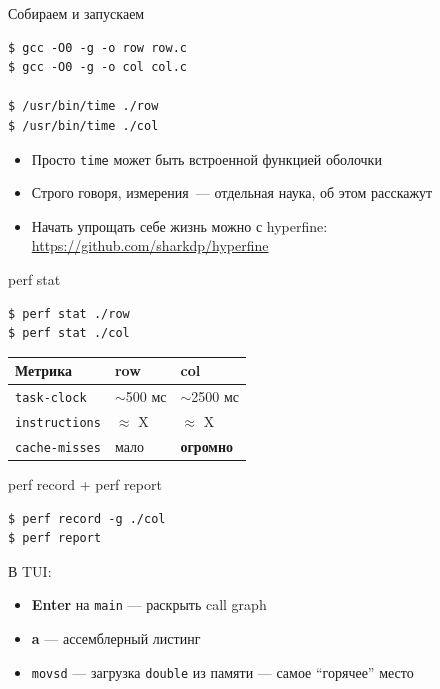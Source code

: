 \documentclass{../../slides-style}
\begin{document}
\begin{frame}[fragile]{Собираем и запускаем}
    \begin{verbatim}
$ gcc -O0 -g -o row row.c
$ gcc -O0 -g -o col col.c

$ /usr/bin/time ./row
$ /usr/bin/time ./col
\end{verbatim}

    \begin{itemize}
        \item Просто \texttt{time} может быть встроенной функцией оболочки
        \item Строго говоря, измерения~--- отдельная наука, об этом расскажут
        \item Начать упрощать себе жизнь можно с hyperfine: \url{https://github.com/sharkdp/hyperfine}
    \end{itemize}

\end{frame}

\begin{frame}[fragile]{perf stat}
    \begin{verbatim}
$ perf stat ./row
$ perf stat ./col
\end{verbatim}

    \bigskip
    \begin{center}
        \begin{tabular}{lll}
            \toprule
            Метрика               & row          & col                      \\
            \midrule
            \texttt{task-clock}   & $\sim$500 мс & $\sim$2500 мс            \\
            \texttt{instructions} & $\approx$ X  & $\approx$ X              \\
            \texttt{cache-misses} & мало         & \alert{\textbf{огромно}} \\
            \bottomrule
        \end{tabular}
    \end{center}

\end{frame}

\begin{frame}[fragile]{perf record + perf report}
    \begin{verbatim}
$ perf record -g ./col
$ perf report
\end{verbatim}

    \bigskip
    В TUI:
    \begin{itemize}
        \item \textbf{Enter} на \texttt{main} --- раскрыть call graph
        \item \textbf{a} --- ассемблерный листинг
        \item \texttt{movsd} --- загрузка \texttt{double} из памяти --- самое \enquote{горячее} место
    \end{itemize}

\end{frame}
\end{document}
